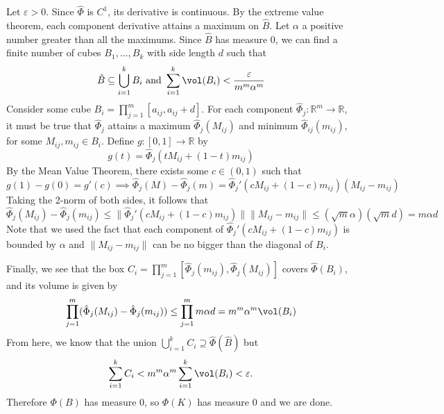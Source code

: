 \documentclass{../../../tex-setup/eh-homework}
\begin{document}
\begin{question}{34}
        Let \(\varepsilon > 0\). Since \(\hat{\Phi}\) is \(C^1\), its derivative is continuous. By the extreme value theorem, each component derivative attains a maximum on \(\hat{B}\). Let \(\alpha\) a positive number greater than all the maximums. Since \(\hat{B}\) has measure 0, we can find a finite number of cubes \(B_1, ..., B_k\) with side length \(d\) such that
        \[
            \hat{B} \subseteq \bigcup_{i=1}^{k} B_i \text{ and } \sum_{i=1}^{k} \vol(B_i) < \frac{\varepsilon}{m^m \alpha^m}
        \]
        Consider some cube \(B_i = \prod_{j=1}^{m} [a_{ij}, a_{ij} + d]\). For each component \(\hat{\Phi}_j: \mathbb{R}^m \to \mathbb{R}\), it must be true that \(\hat{\Phi}_j\) attains a maximum \(\hat{\Phi}_j(M_{ij})\) and minimum \(\hat{\Phi}_{ij}(m_{ij})\), for some \(M_{ij}, m_{ij} \in B_i\). Define \(g: [0,1] \to \mathbb{R}\) by
        \[
            g(t) = \hat{\Phi}_j(t M_{ij} + (1 - t)m_{ij})
        \]
        By the Mean Value Theorem, there exists some \(c \in (0,1)\) such that
        \[
            g(1) - g(0) = g'(c) \implies \hat{\Phi}_j (M) - \hat{\Phi}_j (m) = \hat{\Phi}_j '(c M_{ij} + (1 - c)m_{ij})(M_{ij} - m_{ij})
        \]
        Taking the 2-norm of both sides, it follows that
        \[
            \hat{\Phi}_j (M_{ij}) - \hat{\Phi}_j (m_{ij}) \leq \|\hat{\Phi}_j '(c M_{ij} + (1 - c)m_{ij})\| \|M_{ij} - m_{ij}\| \leq (\sqrt{m} \alpha)(\sqrt{m}d) = m \alpha d
        \]
        Note that we used the fact that each component of \(\hat{\Phi}_j '(c M_{ij} + (1 - c)m_{ij})\) is bounded by \(\alpha\) and \(\|M_{ij} - m_{ij}\|\) can be no bigger than the diagonal of \(B_i\).

        Finally, we see that the box \(C_i = \prod_{j=1}^m [\hat{\Phi}_j(m_{ij}), \hat{\Phi}_j(M_{ij})]\) covers \(\hat{\Phi} (B_i)\), and its volume is given by
        \[
            \prod_{j=1}^m (\hat{\Phi}_j (M_{ij}) - \hat{\Phi}_j (m_{ij})) \leq \prod_{j=1}^m m \alpha d = m^m \alpha^m \vol (B_i)
        \]
        From here, we know that the union \(\bigcup_{i=1}^{k} C_i \supseteq \hat{\Phi}(\hat{B})\) but
        \[
            \sum_{i=1}^{k} C_i < m^m \alpha^m \sum_{i=1}^{k} \vol (B_i) < \varepsilon.
        \]
        Therefore \(\Phi(B)\) has measure 0, so \(\Phi (K)\) has measure 0 and we are done.
    \end{question}
\end{document}

